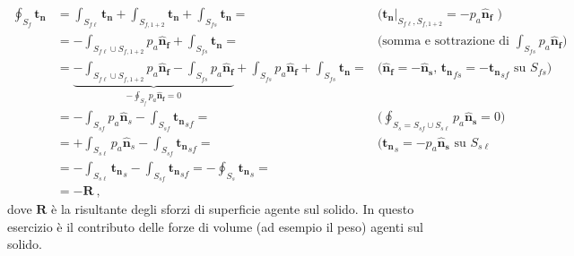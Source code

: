 \begin{itemize}
\begin{equation}
\begin{aligned}
  \oint_{S_f} \bm{t_n} & = 
  \int_{S_{f\ell}} \bm{t_n} + \int_{S_{f,1+2}} \bm{t_n} + \int_{S_{fs}} \bm{t_n} = & \text{($\bm{t_n} |_{S_{f\ell},S_{f,1+2}} = -p_a \bm{\hat{n}_f}$ )}\\
  & = - \int_{S_{f\ell}\cup S_{f,1+2}} p_a \bm{\hat{n}_f} + \int_{S_{fs}} \bm{t_n} = & \text{(somma e sottrazione di $\int_{S_{fs}} p_a \bm{\hat{n}_f}$)}\\
  & = \underbrace{- \int_{S_{f\ell}\cup S_{f,1+2}} p_a \bm{\hat{n}_f} - \int_{S_{fs}} p_a \bm{\hat{n}_f}}_{-\oint_{S_f} p_a \bm{\hat{n}_f}=0}
  + \int_{S_{fs}} p_a \bm{\hat{n}_f} + \int_{S_{fs}} \bm{t_n} = & \text{($\bm{\hat{n}_f} = -\bm{\hat{n}_s}$, ${\bm{t_n}}_{fs} = - {\bm{t_n}}_{sf}$ su $S_{fs}$)} \\
  & = - \int_{S_{sf}} p_a \bm{\hat{n}}_{s} - \int_{S_{sf}} {\bm{t_n}}_{sf} = &
   \text{($\oint_{S_s=S_{sf}\cup S_{s\ell}} p_a \bm{\hat{n}_s} = 0)$} \\
  & = + \int_{S_{s\ell}} p_a \bm{\hat{n}}_{s} - \int_{S_{sf}} {\bm{t_n}}_{sf} = &
   \text{(${\bm{t_n}}_s = -p_a\bm{\hat{n}_s}$ su $S_{s\ell}$} \\
  & = - \int_{S_{s\ell}} {\bm{t_n}}_{s} - \int_{S_{sf}} {\bm{t_n}}_{sf} = - \oint_{S_{s}} {\bm{t_n}}_{s} = \\
  & = - \bm{R} \ ,
\end{aligned}
\end{equation}
dove $\bm{R}$ è la risultante degli sforzi di superficie agente sul solido. In questo esercizio è il contributo delle forze di volume (ad esempio il peso) agenti sul solido.
%



\end{itemize}

